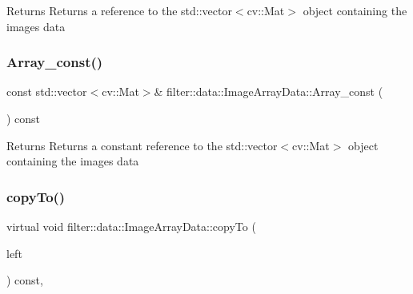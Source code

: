 \begin{DoxyReturn}{Returns}
Returns a reference to the std\+::vector$<$cv\+::\+Mat$>$ object containing the images\textquotesingle{} data 
\end{DoxyReturn}
\mbox{\label{classfilter_1_1data_1_1_image_array_data_a5bc06808faaf76e0cbbb5944788cef79}} 
\subsubsection{\texorpdfstring{Array\+\_\+const()}{Array\_const()}}
{\footnotesize\ttfamily const std\+::vector$<$cv\+::\+Mat$>$\& filter\+::data\+::\+Image\+Array\+Data\+::\+Array\+\_\+const (\begin{DoxyParamCaption}{ }\end{DoxyParamCaption}) const\hspace{0.3cm}{\ttfamily [inline]}}

\begin{DoxyReturn}{Returns}
Returns a constant reference to the std\+::vector$<$cv\+::\+Mat$>$ object containing the images\textquotesingle{} data 
\end{DoxyReturn}
\mbox{\label{classfilter_1_1data_1_1_image_array_data_abc051d3a4e57bdb5a3ee47e35df6ea9d}} 
\subsubsection{\texorpdfstring{copy\+To()}{copyTo()}}
{\footnotesize\ttfamily virtual void filter\+::data\+::\+Image\+Array\+Data\+::copy\+To (\begin{DoxyParamCaption}\item[{\hyperlink{classfilter_1_1data_1_1_image_array_data}{Image\+Array\+Data} \&}]{left }\end{DoxyParamCaption}) const\hspace{0.3cm}{\ttfamily [inline]}, {\ttfamily [virtual]}}


